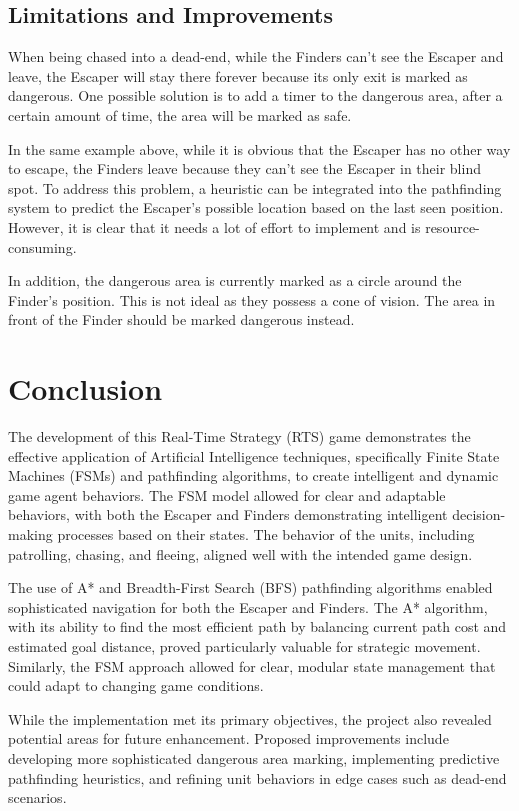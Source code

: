 \documentclass[a4paper,12pt]{article}
\begin{document}
\subsection{Limitations and Improvements}
When being chased into a dead-end, while the Finders can't see the Escaper and leave, the Escaper will stay there forever because its only exit is marked as dangerous.
One possible solution is to add a timer to the dangerous area, after a certain amount of time, the area will be marked as safe.

In the same example above, while it is obvious that the Escaper has no other way to escape, the Finders leave because they can't see the Escaper in their blind spot.
To address this problem, a heuristic can be integrated into the pathfinding system to predict the Escaper's possible location based on the last seen position.
However, it is clear that it needs a lot of effort to implement and is resource-consuming.

In addition, the dangerous area is currently marked as a circle around the Finder's position.
This is not ideal as they possess a cone of vision.
The area in front of the Finder should be marked dangerous instead.



\section{Conclusion}
The development of this Real-Time Strategy (RTS) game demonstrates the effective application of Artificial Intelligence techniques, specifically Finite State Machines (FSMs) and pathfinding algorithms, to create intelligent and dynamic game agent behaviors. 
The FSM model allowed for clear and adaptable behaviors, with both the Escaper and Finders demonstrating intelligent decision-making processes based on their states. The behavior of the units, including patrolling, chasing, and fleeing, aligned well with the intended game design.

The use of A* and Breadth-First Search (BFS) pathfinding algorithms enabled sophisticated navigation for both the Escaper and Finders. The A* algorithm, with its ability to find the most efficient path by balancing current path cost and estimated goal distance, proved particularly valuable for strategic movement. Similarly, the FSM approach allowed for clear, modular state management that could adapt to changing game conditions.

While the implementation met its primary objectives, the project also revealed potential areas for future enhancement. Proposed improvements include developing more sophisticated dangerous area marking, implementing predictive pathfinding heuristics, and refining unit behaviors in edge cases such as dead-end scenarios.





\printbibliography
\end{document}
